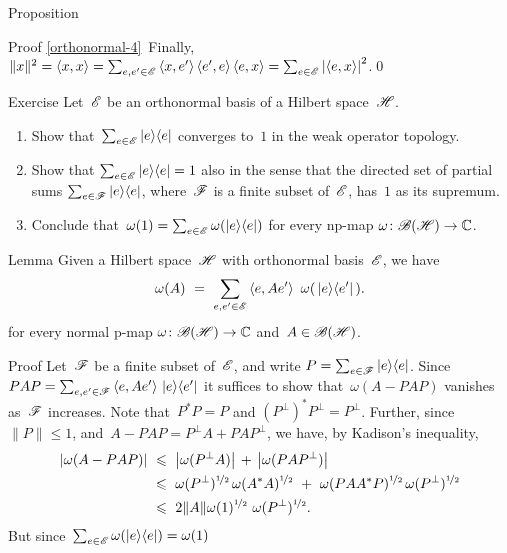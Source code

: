 \documentclass[a]{subfiles}
\begin{document}
\begin{parsec}
\begin{point}[orthonormal]{Proposition}
\begin{point}{Proof}
\ref{orthonormal-4}\ 
Finally,
$\|x\|^2=\left<x,x\right>
= \sum_{e,e'\in\mathscr{E}}
\left<x,e'\right>\left<e',e\right>\left<e,x\right>
= \sum_{e\in \mathscr{E}} \left|\left<e,x\right>\right|^2$.\qed
\end{point}
\end{point}
\begin{point}{Exercise}%
Let~$\mathscr{E}$ be an orthonormal basis of a Hilbert space~$\mathscr{H}$.
\begin{enumerate}
\item
Show that~$\sum_{e\in\mathscr{E}} \left|e\right>\!\left<e\right|$
converges to~$1$
in the weak operator topology.
\item
Show that $\sum_{e\in\mathscr{E}}\left|e\right>\!\left<e\right|=1$
also in the sense
that the directed
set of partial sums
$\sum_{e\in \mathscr{F}} \left|e\right>\!\left<e\right|$,
where~$\mathscr{F}$ is a finite subset of~$\mathscr{E}$,
has~$1$ as its supremum.
\item
Conclude that~$\omega(1)=\sum_{e\in\mathscr{E}} \omega(\left|e\right>\!\left<e\right|)$
for every np-map $\omega\colon \mathscr{B}(\mathscr{H})\to\mathbb{C}$.
\end{enumerate}
\end{point}
\begin{point}[bh-np-lemma]{Lemma}%
Given a Hilbert space~$\mathscr{H}$
with orthonormal basis~$\mathscr{E}$,
we have
\begin{equation*}
	\omega(A)\ = \ 
	\sum_{e,e'\in\scrE} \left<e,Ae'\right>\ \omega(\,\ketbra{e}{e'}\,).
\end{equation*}
for every normal p-map $\omega\colon \mathscr{B}(\mathscr{H})\to\mathbb{C}$
and~$A\in\mathscr{B}(\mathscr{H})$.
\begin{point}{Proof}%
Let~$\mathscr{F}$ be a finite subset of~$\mathscr{E}$,
and write $P=\sum_{e\in \mathscr{F}} \left|e\right>\!\left<e\right|$.
Since $PAP
= \sum_{e,e'\in\mathscr{F}}\left<e,Ae'\right>\,\left|e\right>\!\left<e'\right|$
it suffices
to show that~$\omega(A-PAP)$
vanishes as~$\mathscr{F}$ increases.
Note that~$P^*P=P$ and
$(P^\perp)^*P^\perp=P^\perp$.
Further,
since
$\|P\|\leq 1$,
and~$A-PAP=P^\perp A + PAP^\perp$,
we have,
by Kadison's inequality,
\begin{alignat*}{3}
\left|\omega(A-PAP)\right|
\ &\leq\  \left|\omega(P^\perp A)\right| \,+\,\left|\omega(PAP^\perp)\right| \\
\ &\leq\  
\omega(P^\perp)^{\nicefrac{1}{2}}\,
\omega(A^*A)^{\nicefrac{1}{2}}
\ +\ 
\omega(PAA^*P)^{\nicefrac{1}{2}}\,
\omega(P^\perp)^{\nicefrac{1}{2}}\\
\ &\leq\  
2\|A\| 
\omega(1)^{\nicefrac{1}{2}}\ 
\omega(P^\perp)^{\nicefrac{1}{2}}.
\end{alignat*}
But since~$\sum_{e\in\mathscr{E}} \omega(\left|e\right>\!\left<e\right|)=\omega(1)$

\end{point}
\end{point}
\end{parsec}
\end{document}
